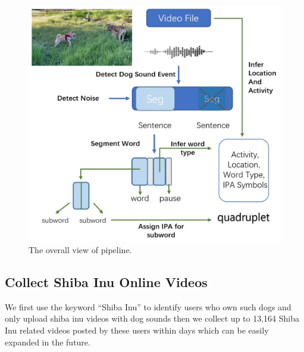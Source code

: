 \begin{figure}[th]
	\centering
	\includegraphics[width=0.9\columnwidth]{images/pipeline.jpg}
	\caption{The overall view of pipeline.}

\label{fig:method}
\end{figure}

\subsection{Collect Shiba Inu Online Videos}
\label{sec:collect_data}
We first use the keyword ``Shiba Inu'' to identify users who own such dogs and only upload shiba inu videos with dog sounds then we collect up to 13,164 Shiba Inu related videos posted by these users within days which can be easily expanded in the future.

